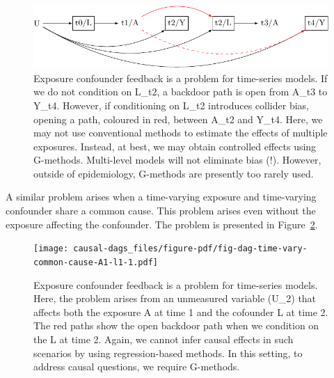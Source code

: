\documentclass[
  singlecolumn]{article}
\begin{document}
\begin{figure}

{\centering \includegraphics[width=1\textwidth,height=\textheight]{causal-dags_files/figure-pdf/fig-dag-9-1.pdf}

}

\caption{\label{fig-dag-9}Exposure confounder feedback is a problem for
time-series models. If we do not condition on L\_t2, a backdoor path is
open from A\_t3 to Y\_t4. However, if conditioning on L\_t2 introduces
collider bias, opening a path, coloured in red, between A\_t2 and Y\_t4.
Here, we may not use conventional methods to estimate the effects of
multiple exposures. Instead, at best, we may obtain controlled effects
using G-methods. Multi-level models will not eliminate bias (!).
However, outside of epidemiology, G-methods are presently too rarely
used.}

\end{figure}

A similar problem arises when a time-varying exposure and time-varying
confounder share a common cause. This problem arises even without the
exposure affecting the confounder. The problem is presented in
Figure~\ref{fig-dag-time-vary-common-cause-A1-l1}.

\begin{figure}

{\centering \texttt{[image: causal-dags\_files/figure-pdf/fig-dag-time-vary-common-cause-A1-l1-1.pdf]}

}

\caption{\label{fig-dag-time-vary-common-cause-A1-l1}Exposure confounder
feedback is a problem for time-series models. Here, the problem arises
from an unmeasured variable (U\_2) that affects both the exposure A at
time 1 and the cofounder L at time 2. The red paths show the open
backdoor path when we condition on the L at time 2. Again, we cannot
infer causal effects in such scenarios by using regression-based
methods. In this setting, to address causal questions, we require
G-methods.}

\end{figure}
\end{document}
